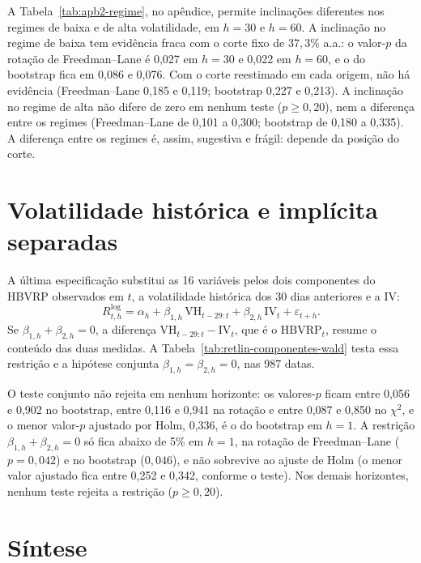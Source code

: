 A Tabela~\ref{tab:apb2-regime}, no apêndice, permite inclinações diferentes
nos regimes de baixa e de alta volatilidade, em $h = 30$ e $h = 60$. A
inclinação no regime de baixa tem evidência fraca com o corte fixo de
$37{,}3\%$ a.a.: o valor-$p$ da rotação de Freedman--Lane \citep{freedman1983nonstochastic} é 0,027 em $h = 30$
e 0,022 em $h = 60$, e o do bootstrap fica em 0,086 e 0,076. Com o corte
reestimado em cada origem, não há evidência (Freedman--Lane 0,185 e 0,119;
bootstrap 0,227 e 0,213). A inclinação no regime de alta não difere de zero
em nenhum teste ($p \ge 0{,}20$), nem a diferença entre os regimes
(Freedman--Lane de 0,101 a 0,300; bootstrap de 0,180 a 0,335). A diferença
entre os regimes é, assim, sugestiva e frágil: depende da posição do corte.

\section{Volatilidade histórica e implícita separadas}
\label{sec:retlin-componentes}

A última especificação substitui as 16 variáveis pelos dois componentes do
HBVRP observados em $t$, a volatilidade histórica dos 30 dias anteriores e a
IV:
\[
R^{\log}_{t,h} = \alpha_h + \beta_{1,h}\,\text{VH}_{t-29:t} + \beta_{2,h}\,\text{IV}_t + \varepsilon_{t+h}.
\]
Se $\beta_{1,h} + \beta_{2,h} = 0$, a diferença
$\text{VH}_{t-29:t} - \text{IV}_t$, que é o $\text{HBVRP}_t$, resume o
conteúdo das duas medidas. A Tabela~\ref{tab:retlin-componentes-wald} testa
essa restrição e a hipótese conjunta $\beta_{1,h} = \beta_{2,h} = 0$, nas 987
datas.



O teste conjunto não rejeita em nenhum horizonte: os valores-$p$ ficam entre
0,056 e 0,902 no bootstrap, entre 0,116 e 0,941 na rotação e entre 0,087 e
0,850 no $\chi^2$, e o menor valor-$p$ ajustado por Holm, 0,336, é o do
bootstrap em $h = 1$. A restrição $\beta_{1,h} + \beta_{2,h} = 0$ só fica
abaixo de 5\% em $h = 1$, na rotação de Freedman--Lane ($p = 0{,}042$) e no
bootstrap ($0{,}046$), e não sobrevive ao ajuste de Holm (o menor valor
ajustado fica entre 0,252 e 0,342, conforme o teste). Nos demais horizontes, nenhum teste rejeita a restrição
($p \ge 0{,}20$).

\section{Síntese}
\label{sec:retlin-sintese}

